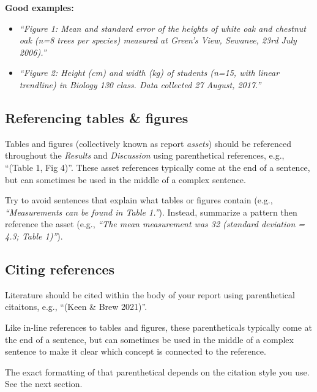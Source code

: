 \documentclass[]{book}
\begin{document}
\textbf{Good examples:}

\begin{itemize}
\item
  \emph{``Figure 1: Mean and standard error of the heights of white oak and chestnut oak (n=8 trees per species) measured at Green's View, Sewanee, 23rd July 2006).''}
\item
  \emph{``Figure 2: Height (cm) and width (kg) of students (n=15, with linear trendline) in Biology 130 class. Data collected 27 August, 2017.''}
\end{itemize}

\hypertarget{referencing-tables-figures}{%
\subsection*{Referencing tables \& figures}\label{referencing-tables-figures}}

Tables and figures (collectively known as report \emph{assets}) should be referenced throughout the \emph{Results} and \emph{Discussion} using parenthetical references, e.g., ``(Table 1, Fig 4)''. These asset references typically come at the end of a sentence, but can sometimes be used in the middle of a complex sentence.

Try to avoid sentences that explain what tables or figures contain (e.g., \emph{``Measurements can be found in Table 1.''}). Instead, summarize a pattern then reference the asset (e.g., \emph{``The mean measurement was 32 (standard deviation = 4.3; Table 1)''}).

\hypertarget{citing-references}{%
\subsection*{Citing references}\label{citing-references}}

Literature should be cited within the body of your report using parenthetical citaitons, e.g., ``(Keen \& Brew 2021)''.

Like in-line references to tables and figures, these parentheticals typically come at the end of a sentence, but can sometimes be used in the middle of a complex sentence to make it clear which concept is connected to the reference.

The exact formatting of that parenthetical depends on the citation style you use. See the next section.
\end{document}
